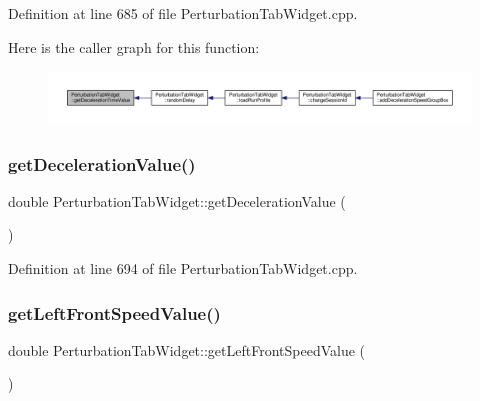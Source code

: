 Definition at line 685 of file Perturbation\+Tab\+Widget.\+cpp.

Here is the caller graph for this function\+:
\nopagebreak
\begin{figure}[H]
\begin{center}
\leavevmode
\includegraphics[width=350pt]{class_perturbation_tab_widget_aa367d865074bb173bc3b9599eb11e10e_icgraph}
\end{center}
\end{figure}
\mbox{\label{class_perturbation_tab_widget_a4f4d6f185008895f009dd49163225604}} 
\subsubsection{\texorpdfstring{get\+Deceleration\+Value()}{getDecelerationValue()}}
{\footnotesize\ttfamily double Perturbation\+Tab\+Widget\+::get\+Deceleration\+Value (\begin{DoxyParamCaption}{ }\end{DoxyParamCaption})}



Definition at line 694 of file Perturbation\+Tab\+Widget.\+cpp.

\mbox{\label{class_perturbation_tab_widget_a1c595f54d7528bd69f949849b3cb9312}} 
\subsubsection{\texorpdfstring{get\+Left\+Front\+Speed\+Value()}{getLeftFrontSpeedValue()}}
{\footnotesize\ttfamily double Perturbation\+Tab\+Widget\+::get\+Left\+Front\+Speed\+Value (\begin{DoxyParamCaption}{ }\end{DoxyParamCaption})}



